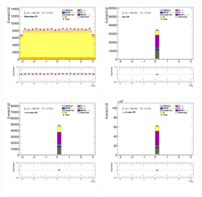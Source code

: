 		\begin{figure}[!htp]
			\begin{center}    
			\includegraphics[width=0.45\textwidth]{chapters/chapter6_HPlus/images/taulep/bjet_0_phi_DILEP_BTAG.png}
			\includegraphics[width=0.45\textwidth]{chapters/chapter6_HPlus/images/taulep/bjet_0_phi_ZEE.png} \\
			\includegraphics[width=0.45\textwidth]{chapters/chapter6_HPlus/images/taulep/bjet_0_phi_TAUEL_BVETO.png} 
			\includegraphics[width=0.45\textwidth]{chapters/chapter6_HPlus/images/taulep/bjet_0_phi_TAUMU_BVETO.png} \\

\end{center}
\end{figure}
